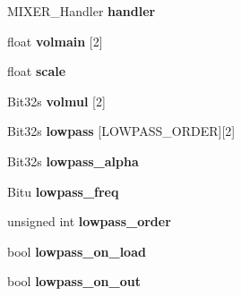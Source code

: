 \begin{DoxyCompactItemize}
\item 
\hypertarget{classMixerChannel_af892cf680b396c0e93a54e3da905ad04}{M\-I\-X\-E\-R\-\_\-\-Handler {\bfseries handler}}\label{classMixerChannel_af892cf680b396c0e93a54e3da905ad04}

\item 
\hypertarget{classMixerChannel_a5dd50a86b6a77a81a6e809ca0aa1e20b}{float {\bfseries volmain} \mbox{[}2\mbox{]}}\label{classMixerChannel_a5dd50a86b6a77a81a6e809ca0aa1e20b}

\item 
\hypertarget{classMixerChannel_aa8dad87dcc79454e5918b3a7eebaed6b}{float {\bfseries scale}}\label{classMixerChannel_aa8dad87dcc79454e5918b3a7eebaed6b}

\item 
\hypertarget{classMixerChannel_a00091530e71a29cbde320013e15390cd}{Bit32s {\bfseries volmul} \mbox{[}2\mbox{]}}\label{classMixerChannel_a00091530e71a29cbde320013e15390cd}

\item 
\hypertarget{classMixerChannel_a53983eb8a65bfb327a2a13608d506093}{Bit32s {\bfseries lowpass} \mbox{[}L\-O\-W\-P\-A\-S\-S\-\_\-\-O\-R\-D\-E\-R\mbox{]}\mbox{[}2\mbox{]}}\label{classMixerChannel_a53983eb8a65bfb327a2a13608d506093}

\item 
\hypertarget{classMixerChannel_aec25b33e66a92276790fd5007bef05b8}{Bit32s {\bfseries lowpass\-\_\-alpha}}\label{classMixerChannel_aec25b33e66a92276790fd5007bef05b8}

\item 
\hypertarget{classMixerChannel_a5acf5f4237c343cceda3e4b168713bf2}{Bitu {\bfseries lowpass\-\_\-freq}}\label{classMixerChannel_a5acf5f4237c343cceda3e4b168713bf2}

\item 
\hypertarget{classMixerChannel_ad883c95fc5dee02d0e5f375cfb4f9d05}{unsigned int {\bfseries lowpass\-\_\-order}}\label{classMixerChannel_ad883c95fc5dee02d0e5f375cfb4f9d05}

\item 
\hypertarget{classMixerChannel_ac0b87191c55d5626b8287edff81011dd}{bool {\bfseries lowpass\-\_\-on\-\_\-load}}\label{classMixerChannel_ac0b87191c55d5626b8287edff81011dd}

\item 
\hypertarget{classMixerChannel_a07578b703ff8cc91767cde3d48d2bd04}{bool {\bfseries lowpass\-\_\-on\-\_\-out}}\label{classMixerChannel_a07578b703ff8cc91767cde3d48d2bd04}


\end{DoxyCompactItemize}
